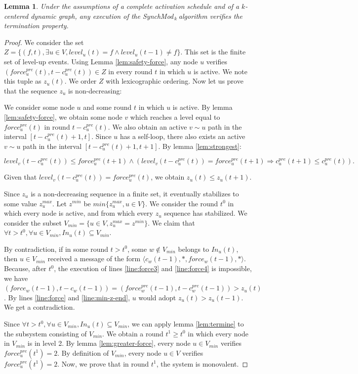 \documentclass[11pt,letterpaper]{article}
\newtheorem{lem}[thm]{Lemma}
\newcommand{\SM}{{\em SynchMod}$_{\,k}\ $}
\begin{document}
\begin{lem}
	Under the assumptions of a complete activation schedule and of a $k$-centered dynamic graph,
	any execution of the \SM algorithm verifies the termination property.
\end{lem}
\begin{proof}
	We consider the set $Z = \{(f,t), \exists u \in V, level_u(t) = f \wedge level_u(t-1) \neq f\}$.
	This set is the finite set of level-up events.
	Using Lemma \ref{lem:safety-force}, any node $u$ verifies $(force_u^{pre}(t), t-c_u^{pre}(t)) \in Z$ in every round $t$ in which $u$ is active.
	We note this tuple as $z_u(t)$.
	We order $Z$ with lexicographic ordering.
	Now let us prove that the sequence $z_u$ is non-decreasing:

	We consider some node $u$ and some round $t$ in which $u$ is active.
	By lemma \ref{lem:safety-force}, we obtain some node $v$ which reaches a level equal to $force_u^{pre}(t)$ in round $t-c_u^{pre}(t)$.
	We also obtain an active $v \sim u$ path in the interval $[t-c_u^{pre}(t)+1,t]$.
	Since $u$ has a self-loop, there also exists an active $v \sim u$ path in the interval $[t-c_u^{pre}(t)+1,t+1]$.
	By lemma \ref{lem:strongest}:

	$$level_v(t-c_u^{pre}(t)) \leq force_u^{pre}(t+1) \wedge (level_v(t-c_u^{pre}(t)) = force_u^{pre}(t+1) \Rightarrow c^{pre}_u(t+1) \leq c_u^{pre}(t)).$$
	
	Given that $level_v(t-c_u^{pre}(t)) = force_u^{pre}(t)$, we obtain $z_u(t) \leq z_u(t+1)$.

	Since $z_u$ is a non-decreasing sequence in a finite set, it eventually stabilizes to some value $z_u^{max}$.
	Let $z^{min}$ be $min \{z_u^{max}, u \in V\}$.
	We consider the round $t^0$ in which every node is active, and from which every $z_u$ sequence has stabilized.
	We consider the subset $V_{min} = \{u \in V, z_u^{max} = z^{min}\}$.
	We claim that $\forall t > t^0, \forall u \in V_{min}, In_u(t) \subseteq V_{min}$.

	By contradiction, if in some round $t > t^0$, some $w \notin V_{min}$ belongs to $In_u(t)$,
	then $u \in V_{min}$ received a message of the form $\langle c_w(t-1), *, force_w(t-1), * \rangle$.
	Because, after $t^0$, the execution of lines \ref{line:force3} and \ref{line:force4} is impossible, we have $(force_w(t-1), t-c_w(t-1)) = (force_w^{pre}(t-1), t-c_w^{pre}(t-1)) > z_u(t)$.
	By lines \ref{line:force} and \ref{line:min-z-end}, $u$ would adopt $z_u(t) > z_u(t-1)$. We get a contradiction.

	Since $\forall t > t^0, \forall u \in V_{min}, In_u(t) \subseteq V_{min}$, we can apply lemma \ref{lem:termine} to the subsystem consisting of $V_{min}$.
	We obtain a round $t^1 \geq t^0$ in which every node in $V_{min}$ is in level 2. By lemma \ref{lem:greater-force}, every node $u \in V_{min}$ verifies $force_u^{pre}(t^1) = 2$.
	By definition of $V_{min}$, every node $u \in V$ verifies $force_u^{pre}(t^1) = 2$.
	Now, we prove that in round $t^1$, the system is monovalent.


\end{proof}
\end{document}
